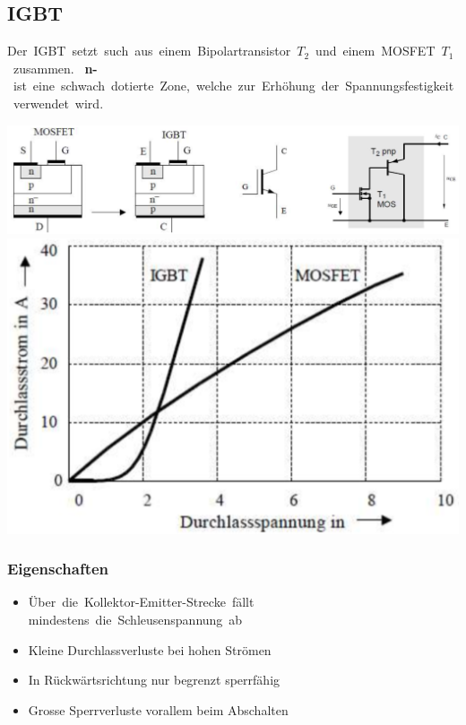 \subsection{IGBT}
\mbox{Der IGBT setzt such aus einem Bipolartransistor $ T_2 $ und einem MOSFET $ T_1 $ zusammen.}\newline
   \mbox{ \textbf{n- }ist eine schwach dotierte Zone, welche zur Erhöhung der Spannungsfestigkeit verwendet wird.}
\begin{center}
  \includegraphics[width=0.7\linewidth]{images/IGBTaufbau}
  \includegraphics[width=0.25\linewidth]{images/IGBTkennlinie}
\end{center}
\vspace{-0.5cm}
\subsubsection{Eigenschaften}
\begin{multicols}{2}
    \begin{itemize}
        \item \mbox{Über die Kollektor-Emitter-Strecke fällt} \newline \mbox{mindestens die Schleusenspannung ab}
        \item Kleine Durchlassverluste bei hohen Strömen
        \item In Rückwärtsrichtung nur begrenzt sperrfähig
        \item Grosse Sperrverluste vorallem beim Abschalten
    \end{itemize}
\end{multicols}
\clearpage

